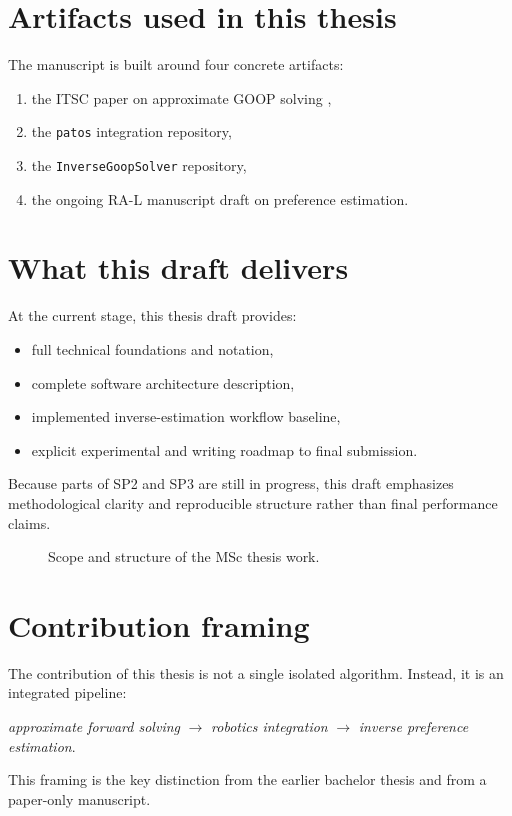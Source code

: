 \section{Artifacts used in this thesis}

The manuscript is built around four concrete artifacts:

\begin{enumerate}
    \item the ITSC paper on approximate GOOP solving \cite{delasheras:2025},
    \item the \texttt{patos} integration repository,
    \item the \texttt{InverseGoopSolver} repository,
    \item the ongoing RA-L manuscript draft on preference estimation.
\end{enumerate}

\section{What this draft delivers}

At the current stage, this thesis draft provides:

\begin{itemize}
    \item full technical foundations and notation,
    \item complete software architecture description,
    \item implemented inverse-estimation workflow baseline,
    \item explicit experimental and writing roadmap to final submission.
\end{itemize}

Because parts of SP2 and SP3 are still in progress, this draft emphasizes
methodological clarity and reproducible structure rather than final
performance claims.

\begin{figure}[tbp]
    \centering
    \caption{Scope and structure of the MSc thesis work.}
    \label{fig:scope_map}
\end{figure}

\section{Contribution framing}

The contribution of this thesis is not a single isolated algorithm. Instead, it
is an integrated pipeline:

\begin{center}
\emph{approximate forward solving} $\rightarrow$
\emph{robotics integration} $\rightarrow$
\emph{inverse preference estimation}.
\end{center}

This framing is the key distinction from the earlier bachelor thesis and from a
paper-only manuscript.
